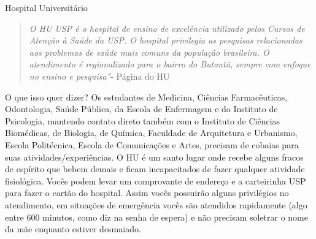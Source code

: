 \begin{secao}{Hospital Universitário}
   \begin{quote}\emph{O HU USP é o hospital de ensino de excelência utilizado
pelos Cursos de Atenção à Saúde da USP.  O hospital privilegia as pesquisas
relacionadas aos problemas de saúde  mais comuns da população brasileira. O
atendimento é regionalizado para o bairro do Butantã, sempre com enfoque no
ensino e pesquisa''}- Página do HU
   \end{quote}

O que isso quer dizer? Os estudantes de Medicina, Ciências Farmacêuticas,
Odontologia, Saúde Pública, da Escola de Enfermagem e do Instituto de
Psicologia, mantendo contato direto também com o Instituto de Ciências
Biomédicas, de Biologia, de Química, Faculdade de Arquitetura e Urbanismo,
Escola Politécnica, Escola de Comunicações e Artes, precisam de cobaias para
suas atividades/experiências. O HU é um santo lugar onde recebe alguns fracos
de espírito que bebem demais e ficam incapacitados de fazer qualquer atividade
fisiológica. Vocês podem levar um comprovante de endereço e a
carteirinha USP para fazer o cartão do hospital. Assim vocês possuirão alguns
privilégios no atendimento, em situações de emergência vocês são atendidos
rapidamente (algo entre 600 minutos, como diz na senha de espera) e não
precisam soletrar o nome da mãe enquanto estiver desmaiado.

\end{secao}
